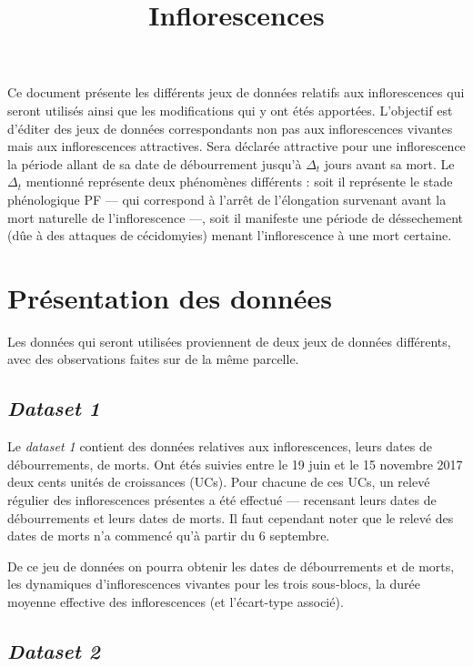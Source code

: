 \documentclass[a4paper, 11pt]{article}
\title{Inflorescences}
\author{}
\date{}
\begin{document}
\maketitle

Ce document présente les différents jeux de données relatifs aux inflorescences qui seront utilisés ainsi que les modifications qui y ont étés apportées.
L'objectif est d'éditer des jeux de données correspondants non pas aux inflorescences vivantes mais aux inflorescences attractives. Sera déclarée attractive pour une inflorescence la période allant de sa date de débourrement jusqu'à $\Delta_t$ jours avant sa mort. Le $\Delta_t$ mentionné représente deux phénomènes différents : soit il représente le stade phénologique PF --- qui correspond à l'arrêt de l'élongation survenant avant la mort naturelle de l'inflorescence ---, soit il manifeste une période de déssechement (dûe à des attaques de cécidomyies) menant l'inflorescence à une mort certaine.

\section{Présentation des données}

Les données qui seront utilisées proviennent de deux jeux de données différents, avec des observations faites sur de la même parcelle.

\subsection{\textit{Dataset 1}}

Le \textit{dataset 1} contient des données relatives aux inflorescences, leurs dates de débourrements, de morts. Ont étés suivies entre le 19 juin et le 15 novembre 2017 deux cents unités de croissances (UCs). Pour chacune de ces UCs, un relevé régulier des inflorescences présentes a été effectué --- recensant leurs dates de débourrements et leurs dates de morts.
Il faut cependant noter que le relevé des dates de morts n'a commencé qu'à partir du 6 septembre.

De ce jeu de données on pourra obtenir les dates de débourrements et de morts, les dynamiques d'inflorescences vivantes pour les trois sous-blocs, la durée moyenne effective des inflorescences (et l'écart-type associé).

\subsection{\textit{Dataset 2}}
\end{document}
